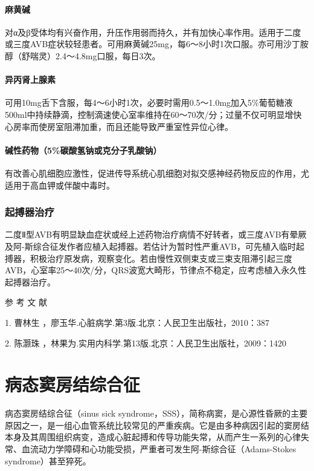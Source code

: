 \paragraph{麻黄碱}

对α及β受体均有兴奋作用，升压作用弱而持久，并有加快心率作用。适用于二度或三度AVB症状较轻患者。可用麻黄碱25mg，每6～8小时1次口服。亦可用沙丁胺醇（舒喘灵）2.4～4.8mg口服，每日3次。

\paragraph{异丙肾上腺素}

可用10mg舌下含服，每4～6小时1次，必要时需用0.5～1.0mg加入5\%葡萄糖液500ml中持续静滴，控制滴速使心室率维持在60～70次/分；过量不仅可明显增快心房率而使房室阻滞加重，而且还能导致严重室性异位心律。

\paragraph{碱性药物（5\%碳酸氢钠或克分子乳酸钠）}

有改善心肌细胞应激性，促进传导系统心肌细胞对拟交感神经药物反应的作用，尤适用于高血钾或伴酸中毒时。

\subsubsection{起搏器治疗}

二度Ⅱ型AVB有明显缺血症状或经上述药物治疗病情不好转者，或三度AVB有晕厥及阿-斯综合征发作者应植入起搏器。若估计为暂时性严重AVB，可先植入临时起搏器，积极治疗原发病，观察变化。若由慢性双侧束支或三束支阻滞引起三度AVB，心室率25～40次/分，QRS波宽大畸形，节律点不稳定，应考虑植入永久性起搏器治疗。

\hypertarget{text00297.htmlux5cux23CHP10-2-10-4}{}
参 考 文 献

1. 曹林生 ，廖玉华.心脏病学.第3版.北京：人民卫生出版社，2010：387

2. 陈灏珠 ，林果为.实用内科学.第13版.北京：人民卫生出版社，2009：1420

\protect\hypertarget{text00298.html}{}{}

\section{病态窦房结综合征}

病态窦房结综合征（sinus sick
syndrome，SSS），简称病窦，是心源性昏厥的主要原因之一，是一组心血管系统比较常见的严重疾病。它是由多种病因引起的窦房结本身及其周围组织病变，造成心脏起搏和传导功能失常，从而产生一系列的心律失常、血流动力学障碍和心功能受损，严重者可发生阿-斯综合征（Adams-Stokes
syndrome）甚至猝死。

